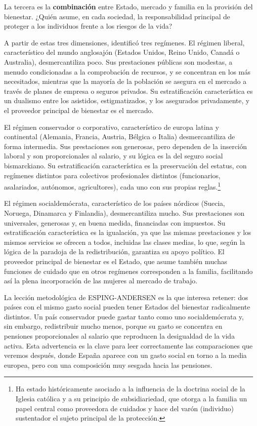 \documentclass[10pt,a4paper]{article}
\begin{document}
La tercera es la \textbf{combinación} entre Estado, mercado y familia en la provisión del bienestar. ¿Quién asume, en cada sociedad, la responsabilidad principal de proteger a los individuos frente a los riesgos de la vida?

A partir de estas tres dimensiones, identificó tres regímenes. El régimen liberal, característico del mundo anglosajón (Estados Unidos, Reino Unido, Canadá o Australia), desmercantiliza poco. Sus prestaciones públicas son modestas, a menudo condicionadas a la comprobación de recursos, y se concentran en los más necesitados, mientras que la mayoría de la población se asegura en el mercado a través de planes de empresa o seguros privados. Su estratificación característica es un dualismo entre los asistidos, estigmatizados, y los asegurados privadamente, y el proveedor principal de bienestar es el mercado.

El régimen conservador o corporativo, característico de europa latina y continental (Alemania, Francia, Austria, Bélgica o Italia) desmercantiliza de forma intermedia. Sus prestaciones son generosas, pero dependen de la inserción laboral y son proporcionales al salario, y su lógica es la del seguro social bismarckiano. Su estratificación característica es la preservación del estatus, con regímenes distintos para colectivos profesionales distintos (funcionarios, asalariados, autónomos, agricultores), cada uno con sus propias reglas.\footnote{Ha estado históricamente asociado a la influencia de la doctrina social de la Iglesia católica y a su principio de subsidiariedad, que otorga a la familia un papel central como proveedora de cuidados y hace del varón (individuo) sustentador el sujeto principal de la protección.
}

El régimen socialdemócrata, característico de los países nórdicos (Suecia, Noruega, Dinamarca y Finlandia), desmercantiliza mucho. Sus prestaciones son universales, generosas y, en buena medida, financiadas con impuestos. Su estratificación característica es la igualación, ya que las mismas prestaciones y los mismos servicios se ofrecen a todos, incluidas las clases medias, lo que, según la lógica de la paradoja de la redistribución, garantiza su apoyo político. El proveedor principal de bienestar es el Estado, que asume también muchas funciones de cuidado que en otros regímenes corresponden a la familia, facilitando así la plena incorporación de las mujeres al mercado de trabajo.

La lección metodológica de ESPING-ANDERSEN es la que interesa retener: dos países con el mismo gasto social pueden tener Estados del bienestar radicalmente distintos. Un país conservador puede gastar tanto como uno socialdemócrata y, sin embargo, redistribuir mucho menos, porque su gasto se concentra en pensiones proporcionales al salario que reproducen la desigualdad de la vida activa. Esta advertencia es la clave para leer correctamente las comparaciones que veremos después, donde España aparece con un gasto social en torno a la media europea, pero con una composición muy sesgada hacia las pensiones.
\end{document}
